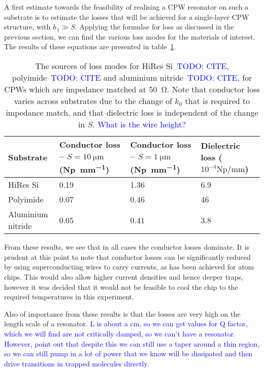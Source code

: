 \documentclass[a4paper]{article}
\newcommand{\cm}[1]{\textcolor{blue}{#1}} %
\begin{document}
A first estimate towards the feasibility of realising a CPW resonator on such a
substrate is to estimate the losses that will be achieved for a single-layer CPW
structure, with $h_1 \gg S$. Applying the formulae for loss as discussed in the
previous section, we can find the various loss modes for the materials of
interest. The results of these equations are presented in
table~\ref{table:losses}.

\begin{table}[h]
  \begin{tabularx}{\textwidth}{lXXX}
    Substrate &
    Conductor loss -- $S=\SI{10}{\micro\meter}$ (\si{\neper \per \milli \meter})
    & Conductor loss -- $S=\SI{1}{\micro\meter}$ (\si{\neper \per \milli \meter})
    & Dielectric loss ($10^{-4}\si{\neper \per \milli \meter}$) \\
    \hline
    HiRes Si & 0.19 & 1.36 & 6.9 \\
    Polyimide & 0.07 & 0.46 & 46 \\
    Aluminium nitride & 0.05 & 0.41 & 3.8
  \end{tabularx}
  \caption{The sources of loss modes for HiRes Si~\cm{TODO: CITE}, polyimide~\cm{TODO: CITE}
  and aluminium nitride~\cm{TODO: CITE}, for CPWs which are impedance matched at
  \SI{50}{\ohm}. Note that conductor loss varies across substrates due to the
  change of $k_0$ that is required to impedance match, and that dielectric loss
    is independent of the change in $S$. \cm{What is the wire height?}}
    \label{table:losses}
\end{table}

From these results, we see that in all cases the conductor losses dominate.  It
  is prudent at this point to note that conductor losses can be significantly
  reduced by using superconducting wires to carry currents, as has been achieved
  for atom chips\cite{PhysRevLett.97.200405, Hattermann2017}. This would also
  allow higher current densities and hence deeper traps, however it was decided
  that it would not be feasible to cool the chip to the required temperatures in
  this experiment.
  
Also of importance from these results is that the losses are very high on the
  length scale of a resonator. \cm{L is about a cm, so we can get values for Q
  factor, which we will find are not critically damped, so we can't have a
  resonator. However, point out that despite this we can still use a taper
  around a thin region, so we can still pump in a lot of power that we know will
  be dissipated and then drive transitions in trapped molecules directly.}




\end{document}
